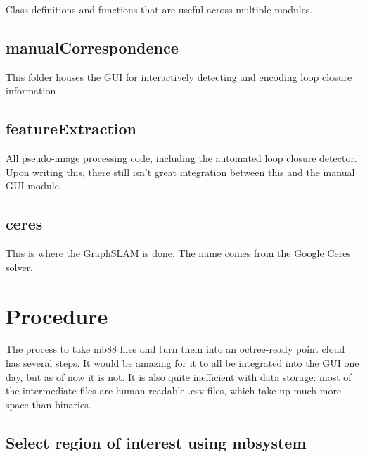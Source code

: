\documentclass[12pt]{amsart}
\begin{document}
Class definitions and functions that are useful across multiple modules.

\subsection{manualCorrespondence}

This folder houses the GUI for interactively detecting and encoding loop closure information 

\subsection{featureExtraction}

All pseudo-image processing code, including the automated loop closure detector. Upon writing this, there still isn't great integration between this and the manual GUI module.

\subsection{ceres}

This is where the GraphSLAM is done. The name comes from the Google Ceres solver.



\section{Procedure}

The process to take mb88 files and turn them into an octree-ready point cloud has several steps. It would be amazing for it to all be integrated into the GUI one day, but as of now it is not. It is also quite inefficient with data storage: most of the intermediate files are human-readable .csv files, which take up much more space than binaries.

\subsection{Select region of interest using mbsystem}
\end{document}
